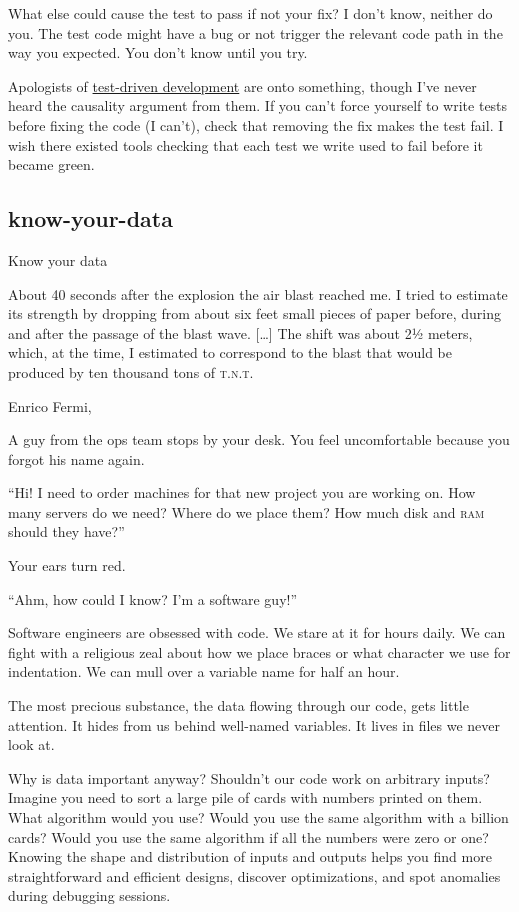 \documentclass{article}
\begin{document}
What else could cause the test to pass if not your fix?
I don't know, neither do you.
The test code might have a bug or not trigger the relevant code path in the way you expected.
You don't know until you try.

Apologists of \href{https://en.wikipedia.org/wiki/Test-driven_development}{test-driven development} are onto something,
though I've never heard the causality argument from them.
If you can't force yourself to write tests before fixing the code (I can't),
check that removing the fix makes the test fail.
I wish there existed tools checking that each test we write used to fail before it became green.

\subsection{know-your-data}{Know your data}
\epigraph{
  About 40 seconds after the explosion the air blast reached me.
  I tried to estimate its strength by dropping from about six feet small pieces of paper before, during and after the passage of the blast wave.
  [\ldots]
  The shift was about 2½ meters, which, at the time, I estimated to correspond to the blast that would be produced by ten thousand tons of \textsc{t.n.t.}
}{Enrico Fermi, \href{https://www.atomicarchive.com/resources/documents/trinity/fermi.html}{\cite{My Observations During the Explosion at Trinity on July 16, 1945}}}

A guy from the ops team stops by your desk. You feel uncomfortable because you forgot his name again.

``Hi! I need to order machines for that new project you are working on.
How many servers do we need?
Where do we place them?
How much disk and \textsc{ram} should they have?''

Your ears turn red.

``Ahm, how could I know? I'm a software guy!''

Software engineers are obsessed with code.
We stare at it for hours daily.
We can fight with a religious zeal about how we place braces or what character we use for indentation.
We can mull over a variable name for half an hour.

The most precious substance, the data flowing through our code, gets little attention.
It hides from us behind well-named variables.
It lives in files we never look at.

Why is data important anyway?
Shouldn't our code work on arbitrary inputs?
Imagine you need to sort a large pile of cards with numbers printed on them.
What algorithm would you use?
Would you use the same algorithm with a billion cards?
Would you use the same algorithm if all the numbers were zero or one?
Knowing the shape and distribution of inputs and outputs helps you find more straightforward and efficient designs, discover optimizations, and spot anomalies during debugging sessions.
\end{document}
